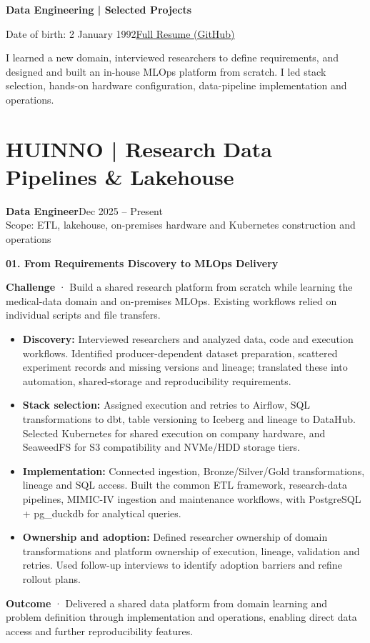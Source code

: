 \documentclass[a4paper,10pt]{article}
\newcommand{\role}[3]{\textbf{#1}\hfill{\small #2}\\{\small\color{muted}#3}\par}
\newcommand{\project}[2]{\vspace{5pt}\textbf{\color{accent}#1}\hfill{\small\color{muted}#2}\par}
\begin{document}
{\fontsize{25}{31}\selectfont\bfseries\color{accent}Data Engineering | Selected Projects}\par
{\small Date of birth: 2 January 1992\hfill\href{https://github.com/msk-psp/resume/blob/master/resume_english.pdf}{\color{accent}\underline{Full Resume (GitHub)}}}\par
I learned a new domain, interviewed researchers to define requirements, and designed and built an in-house MLOps platform from scratch. I led stack selection, hands-on hardware configuration, data-pipeline implementation and operations.

\section{HUINNO | Research Data Pipelines \& Lakehouse}
\role{Data Engineer}{Dec 2025 -- Present}{Scope: ETL, lakehouse, on-premises hardware and Kubernetes construction and operations}
\project{01. From Requirements Discovery to MLOps Delivery}{}
\textbf{Challenge} · Build a shared research platform from scratch while learning the medical-data domain and on-premises MLOps. Existing workflows relied on individual scripts and file transfers.
\begin{itemize}
\item \textbf{Discovery:} Interviewed researchers and analyzed data, code and execution workflows. Identified producer-dependent dataset preparation, scattered experiment records and missing versions and lineage; translated these into automation, shared-storage and reproducibility requirements.
\item \textbf{Stack selection:} Assigned execution and retries to Airflow, SQL transformations to dbt, table versioning to Iceberg and lineage to DataHub. Selected Kubernetes for shared execution on company hardware, and SeaweedFS for S3 compatibility and NVMe/HDD storage tiers.
\item \textbf{Implementation:} Connected ingestion, Bronze/Silver/Gold transformations, lineage and SQL access. Built the common ETL framework, research-data pipelines, MIMIC-IV ingestion and maintenance workflows, with PostgreSQL + pg\_duckdb for analytical queries.
\item \textbf{Ownership and adoption:} Defined researcher ownership of domain transformations and platform ownership of execution, lineage, validation and retries. Used follow-up interviews to identify adoption barriers and refine rollout plans.
\end{itemize}
\textbf{Outcome} · Delivered a shared data platform from domain learning and problem definition through implementation and operations, enabling direct data access and further reproducibility features.
\end{document}
